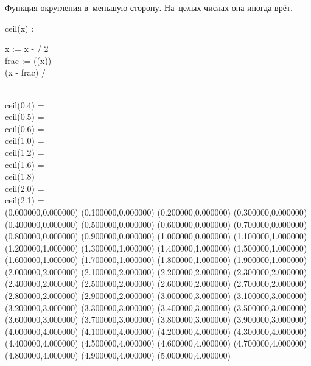 \documentclass[a4paper, 14pt]{extarticle}
\begin{document}
    Функция округления в~меньшую сторону. На~целых числах она иногда врёт.

    \begin{preproc}

        ceil(x) := \begin{block}
                       x := x \cdot \pi - \pi / 2 \\
                       frac := \arctan(\tan(x)) \\
                       (x - frac) / \pi
        \end{block} \\

        ceil(0.4) =  \\
        ceil(0.5) =  \\
        ceil(0.6) =  \\
        ceil(1.0) =  \\
        ceil(1.2) =  \\
        ceil(1.6) =  \\
        ceil(1.8) =  \\
        ceil(2.0) =  \\
        ceil(2.1) =  \\

         {(0.000000,0.000000)
            (0.100000,0.000000)
            (0.200000,0.000000)
            (0.300000,0.000000)
            (0.400000,0.000000)
            (0.500000,0.000000)
            (0.600000,0.000000)
            (0.700000,0.000000)
            (0.800000,0.000000)
            (0.900000,0.000000)
            (1.000000,0.000000)
            (1.100000,1.000000)
            (1.200000,1.000000)
            (1.300000,1.000000)
            (1.400000,1.000000)
            (1.500000,1.000000)
            (1.600000,1.000000)
            (1.700000,1.000000)
            (1.800000,1.000000)
            (1.900000,1.000000)
            (2.000000,2.000000)
            (2.100000,2.000000)
            (2.200000,2.000000)
            (2.300000,2.000000)
            (2.400000,2.000000)
            (2.500000,2.000000)
            (2.600000,2.000000)
            (2.700000,2.000000)
            (2.800000,2.000000)
            (2.900000,2.000000)
            (3.000000,3.000000)
            (3.100000,3.000000)
            (3.200000,3.000000)
            (3.300000,3.000000)
            (3.400000,3.000000)
            (3.500000,3.000000)
            (3.600000,3.000000)
            (3.700000,3.000000)
            (3.800000,3.000000)
            (3.900000,3.000000)
            (4.000000,4.000000)
            (4.100000,4.000000)
            (4.200000,4.000000)
            (4.300000,4.000000)
            (4.400000,4.000000)
            (4.500000,4.000000)
            (4.600000,4.000000)
            (4.700000,4.000000)
            (4.800000,4.000000)
            (4.900000,4.000000)
            (5.000000,4.000000)
        }\end{preproc}
\end{document}
